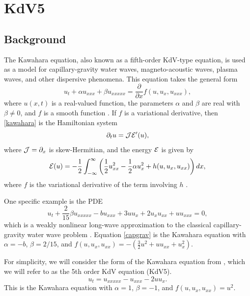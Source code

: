 \documentclass[thesis.tex]{subfiles}
\begin{document}
\iffulldocument\else
	\chapter{KdV5}
\fi

\section{Background}

The Kawahara equation, also known as a fifth-order KdV-type equation, is used as a model for capillary-gravity water waves, magneto-acoustic waves, plasma waves, and other dispersive phenomena. This equation takes the general form
\begin{equation}\label{kawahara}
u_t + \alpha u_{xxx} + \beta u_{xxxxx} = \frac{\partial}{\partial x} f(u, u_x, u_{xxx}),
\end{equation}
where $u(x, t)$ is a real-valued function, the parameters $\alpha$ and $\beta$ are real with $\beta \neq 0$, and $f$ is a smooth function \cite{Bridges2002,Bridges2002a}. If $f$ is a variational derivative, then \cref{kawahara} is the Hamiltonian system
\[
\partial_t u = \mathcal{J} \mathcal{E}'(u),
\]
where $\mathcal{J} = \partial_x$ is skew-Hermitian, and the energy $\mathcal{E}$ is given by
\[
\mathcal{E}(u) = -\frac{1}{2}\int_{-\infty}^\infty 
\left( \frac{1}{2}u_{xx}^2 - \frac{1}{2}\alpha u_x^2 + h(u, u_x, u_{xx})\right)dx,
\]
where $f$ is the variational derivative of the term involving $h$ \cite{Bridges2002}.

One specific example is the PDE
\begin{equation}\label{capgrav}
u_t + \frac{2}{15} \beta u_{xxxxx} - b u_{xxx}
+ 3 u u_x + 2 u_x u_{xx} + u u_{xxx} = 0,
\end{equation}
which is a weakly nonlinear long-wave approximation to the classical capillary-gravity water wave problem \cite{Sandstede2013,Champneys1997,Champneys1998}. Equation \cref{capgrav} is the Kawahara equation with $\alpha = -b$, $\beta = 2/15$, and $f(u, u_x, u_{xx}) = -(\frac{3}{2}u^2 + u u_{xx} + u_x^2)$.

For simplicity, we will consider the form of the Kawahara equation from \cite{Pelinovsky2007}, which we will refer to as the 5th order KdV equation (KdV5).
\begin{equation}\label{KdV5}
u_t = u_{xxxxx} - u_{xxx} - 2 u u_x .
\end{equation}
This is the Kawahara equation with $\alpha = 1$, $\beta = -1$, and $f(u, u_x, u_{xx}) = u^2$.
\end{document}
